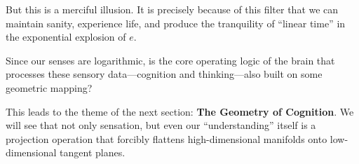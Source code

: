 But this is a merciful illusion. It is precisely because of this filter that we can maintain sanity, experience life, and produce the tranquility of ``linear time'' in the exponential explosion of $e$.

Since our senses are logarithmic, is the core operating logic of the brain that processes these sensory data---cognition and thinking---also built on some geometric mapping?

This leads to the theme of the next section: \textbf{The Geometry of Cognition}. We will see that not only sensation, but even our ``understanding'' itself is a projection operation that forcibly flattens high-dimensional manifolds onto low-dimensional tangent planes.

